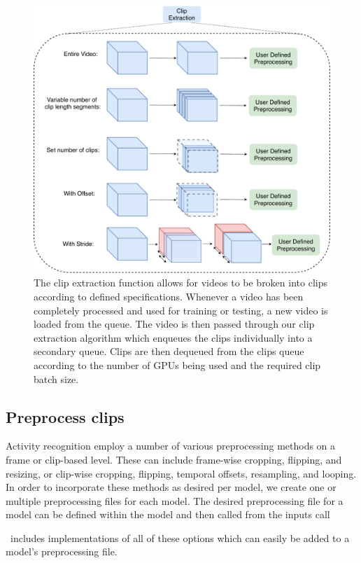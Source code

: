 \documentclass{llncs}
\begin{document}
\begin{figure}[b!]
\centering
\includegraphics[width=0.8\columnwidth]{images/extract_clips.pdf}
\caption{The clip extraction function allows for videos to be broken into clips according to defined specifications.
Whenever a video has been completely processed and used for training or testing, a new video is loaded from the queue.
The video is then passed through our clip extraction algorithm which enqueues the clips individually into a secondary queue.
Clips are then dequeued from the clips queue according to the number of GPUs being used and the required clip batch size.}
\label{fig:extract_clips}
\end{figure}


\subsection{Preprocess clips}
\label{sec:preprocessclips}
Activity recognition employ a number of various preprocessing methods on a frame or clip-based level.
These can include frame-wise cropping, flipping, and resizing, or clip-wise cropping, flipping, temporal offsets, resampling, and looping.
In order to incorporate these methods as desired per model, we create one or multiple preprocessing files for each model.
The desired preprocessing file for a model can be defined within the model and then called from the inputs call

\acro~includes implementations of all of these options which can easily be added to a model's preprocessing file.
\end{document}
